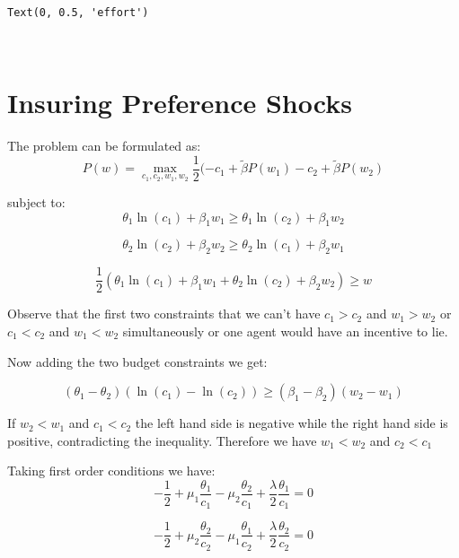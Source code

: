 \documentclass[11pt]{article}
\makeatletter
\newcommand{\boxspacing}{\kern\kvtcb@left@rule\kern\kvtcb@boxsep}
\newcommand{\prompt}[4]{
        \ttfamily\llap{{\color{#2}[#3]:\hspace{3pt}#4}}\vspace{-\baselineskip}
    }
\makeatother
\begin{document}
            \begin{tcolorbox}[breakable, size=fbox, boxrule=.5pt, pad at break*=1mm, opacityfill=0]
\prompt{Out}{outcolor}{176}{\boxspacing}
\begin{Verbatim}[commandchars=\\\{\}]
Text(0, 0.5, 'effort')
\end{Verbatim}
\end{tcolorbox}
        
    \begin{center}
    \end{center}
    { \hspace*{\fill} \\}
    
    \hypertarget{insuring-preference-shocks}{%
\section{Insuring Preference Shocks}\label{insuring-preference-shocks}}

    The problem can be formulated as: \[
P(w) = \max_{c_1, c_2, w_1, w_2} \frac{1}{2} (- c_1 + \tilde{\beta} P(w_1) - c_2 + \tilde{\beta} P(w_2)
\]

subject to: \[
\theta_1 \ln(c_1) + \beta_1 w_1 \geq \theta_1 \ln(c_2) + \beta_1 w_2
\]

\[
\theta_2 \ln(c_2) + \beta_2 w_2 \geq \theta_2 \ln(c_1) + \beta_2 w_1
\]

\[
\frac{1}{2} ( \theta_1 \ln(c_1) + \beta_1 w_1 + \theta_2 \ln(c_2) + \beta_2 w_2)  \geq w
\]

Observe that the first two constraints that we can't have \(c_1 > c_2\)
and \(w_1 > w_2\) or \(c_1 < c_2\) and \(w_1 < w_2\) simultaneously or
one agent would have an incentive to lie.

Now adding the two budget constraints we get:

\[
(\theta_1 - \theta_2) (\ln(c_1) - \ln(c_2)) \geq (\beta_1 - \beta_2) (w_2 - w_1)
\]

If \(w_2 < w_1\) and \(c_1 < c_2\) the left hand side is negative while
the right hand side is positive, contradicting the inequality. Therefore
we have \(w_1 < w_2\) and \(c_2 < c_1\)

    Taking first order conditions we have: \[
-\frac{1}{2} + \mu_1 \frac{\theta_1}{c_1} - \mu_2 \frac{\theta_2}{c_1} + \frac{\lambda}{2} \frac{\theta_1}{c_1} = 0
\]

\[
-\frac{1}{2} + \mu_2 \frac{\theta_2}{c_2} - \mu_1 \frac{\theta_1}{c_2} + \frac{\lambda}{2} \frac{\theta_2}{c_2} = 0
\]
\end{document}
